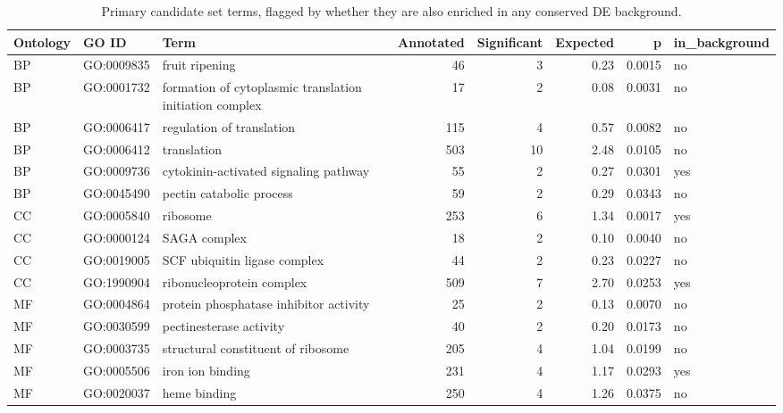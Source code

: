 \begin{table}

\caption{Primary candidate set terms, flagged by whether they are also enriched in any conserved DE background.}
\centering
\begin{tabular}[t]{lllrrrrl}
\toprule
Ontology & GO ID & Term & Annotated & Significant & Expected & p & in\_background\\
\midrule
BP & GO:0009835 & fruit ripening & 46 & 3 & 0.23 & 0.0015 & no\\
BP & GO:0001732 & formation of cytoplasmic translation initiation complex & 17 & 2 & 0.08 & 0.0031 & no\\
BP & GO:0006417 & regulation of translation & 115 & 4 & 0.57 & 0.0082 & no\\
BP & GO:0006412 & translation & 503 & 10 & 2.48 & 0.0105 & no\\
BP & GO:0009736 & cytokinin-activated signaling pathway & 55 & 2 & 0.27 & 0.0301 & yes\\
BP & GO:0045490 & pectin catabolic process & 59 & 2 & 0.29 & 0.0343 & no\\
CC & GO:0005840 & ribosome & 253 & 6 & 1.34 & 0.0017 & yes\\
CC & GO:0000124 & SAGA complex & 18 & 2 & 0.10 & 0.0040 & no\\
CC & GO:0019005 & SCF ubiquitin ligase complex & 44 & 2 & 0.23 & 0.0227 & no\\
CC & GO:1990904 & ribonucleoprotein complex & 509 & 7 & 2.70 & 0.0253 & yes\\
MF & GO:0004864 & protein phosphatase inhibitor activity & 25 & 2 & 0.13 & 0.0070 & no\\
MF & GO:0030599 & pectinesterase activity & 40 & 2 & 0.20 & 0.0173 & no\\
MF & GO:0003735 & structural constituent of ribosome & 205 & 4 & 1.04 & 0.0199 & no\\
MF & GO:0005506 & iron ion binding & 231 & 4 & 1.17 & 0.0293 & yes\\
MF & GO:0020037 & heme binding & 250 & 4 & 1.26 & 0.0375 & no\\
\bottomrule
\end{tabular}
\end{table}
